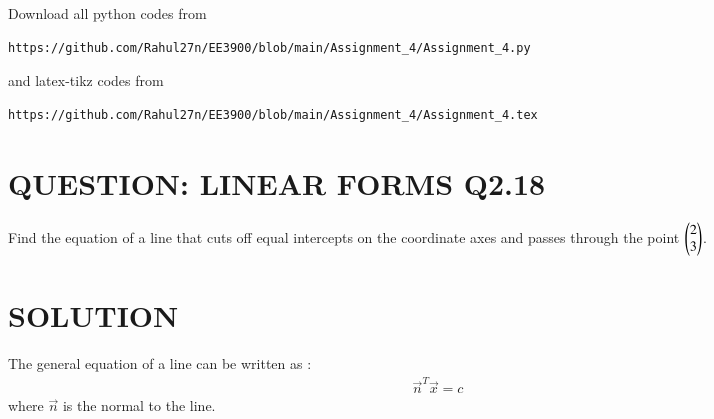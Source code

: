 \documentclass[journal,12pt,twocolumn]{IEEEtran}
\begin{document}
\maketitle
\newpage
\bigskip
\renewcommand{\thefigure}{\theenumi}
\renewcommand{\thetable}{\theenumi}
Download all python codes from 
\begin{lstlisting}
https://github.com/Rahul27n/EE3900/blob/main/Assignment_4/Assignment_4.py
\end{lstlisting}
%
and latex-tikz codes from 
%
\begin{lstlisting}
https://github.com/Rahul27n/EE3900/blob/main/Assignment_4/Assignment_4.tex
\end{lstlisting}
\vspace{0.5cm}
\section{QUESTION: LINEAR FORMS Q2.18}
Find the equation of a line that cuts off equal intercepts on the coordinate axes and passes through the point $\begin{pmatrix}2 \\ 3\end{pmatrix}$.
\section{SOLUTION}
The general equation of a line can be written as :
\begin{align}
\vec{n}^T\vec{x}=c \label{eq:1}  
\end{align}
where $\vec{n}$ is the normal to the line.
\end{document}
